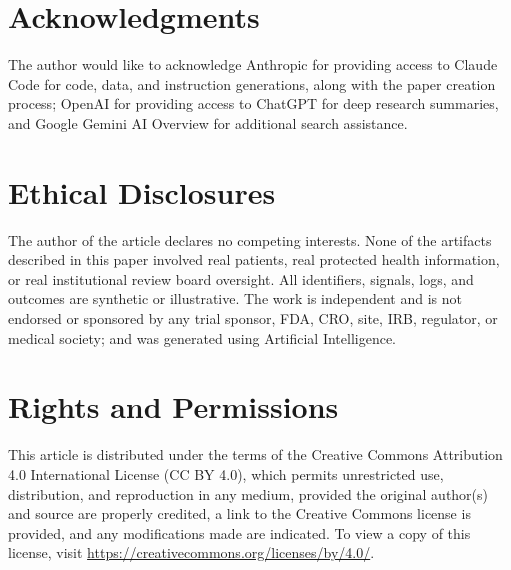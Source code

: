 %

{}
\section*{Acknowledgments}
\label{sec:acknowledgments}

The author would like to acknowledge Anthropic for providing access to
Claude Code for code, data, and instruction generations, along with
the paper creation process; OpenAI for providing access to ChatGPT
for deep research summaries, and Google Gemini AI Overview for
additional search assistance.

{}
\section*{Ethical Disclosures}
\label{sec:ethics}

The author of the article declares no competing interests. None of
the artifacts described in this paper involved real patients, real
protected health information, or real institutional review board
oversight. All identifiers, signals, logs, and outcomes are
synthetic or illustrative. The work is independent and is not
endorsed or sponsored by any trial sponsor, FDA, CRO, site, IRB,
regulator, or medical society; and was generated using Artificial
Intelligence.

{}
\section*{Rights and Permissions}
\label{sec:rights}

This article is distributed under the terms of the Creative Commons
Attribution 4.0 International License (CC BY 4.0), which permits
unrestricted use, distribution, and reproduction in any medium,
provided the original author(s) and source are properly credited, a
link to the Creative Commons license is provided, and any
modifications made are indicated. To view a copy of this license,
visit \url{https://creativecommons.org/licenses/by/4.0/}.

